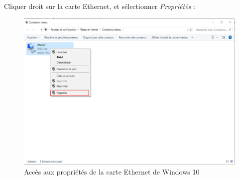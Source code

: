 \newpage
Cliquer droit sur la carte Ethernet, et sélectionner \textit{Propriétés} :
\begin{figure}[h!]
	\begin{center}
		\includegraphics[scale=0.8]{W_Screenshots/43.png}
		\caption{Accès aux propriétés de la carte Ethernet de Windows 10}
		\label{W_Screenshots/43}
	\end{center}
\end{figure}
\FloatBarrier

